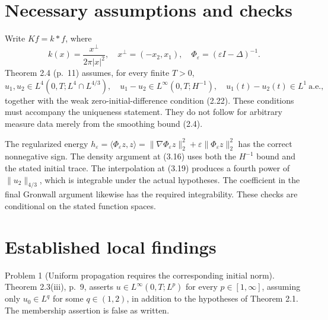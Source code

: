 \documentclass[10pt]{article}
\begin{document}
\section*{Necessary assumptions and checks}
Write \(Kf=k*f\), where \[k(x)=\frac{x^\perp}{2\pi |x|^2},\quad
 x^\perp=(-x_2,x_1),\quad \Phi_\varepsilon=(\varepsilon I-\Delta)^{-1}.\] Theorem 2.4 (p. 11) assumes, for every finite \(T>0\), \[u_1,u_2\in L^4(0,T;L^4\cap L^{4/3}),\quad
 u_1-u_2\in L^\infty(0,T;H^{-1}),\quad
 u_1(t)-u_2(t)\in L^1\ \text{a.e.},\] together with the weak zero-initial-difference condition (2.22). These conditions must accompany the uniqueness statement. They do not follow for arbitrary measure data merely from the smoothing bound (2.4).\par
The regularized energy \(h_\varepsilon=\langle\Phi_\varepsilon z,z\rangle
=\|\nabla\Phi_\varepsilon z\|_2^2+\varepsilon\|\Phi_\varepsilon z\|_2^2\) has the correct nonnegative sign. The density argument at (3.16) uses both the \(H^{-1}\) bound and the stated initial trace. The interpolation at (3.19) produces a fourth power of \(\|u_2\|_{4/3}\), which is integrable under the actual hypotheses. The coefficient in the final Gronwall argument likewise has the required integrability. These checks are conditional on the stated function spaces.\par
\section*{Established local findings}
Problem 1 (Uniform propagation requires the corresponding initial norm).  Theorem 2.3(iii), p. 9, asserts \(u\in L^\infty(0,T;L^p)\) for every \(p\in[1,\infty]\), assuming only \(u_0\in L^q\) for some \(q\in(1,2)\), in addition to the hypotheses of Theorem 2.1. The membership assertion is false as written.\par
\end{document}
